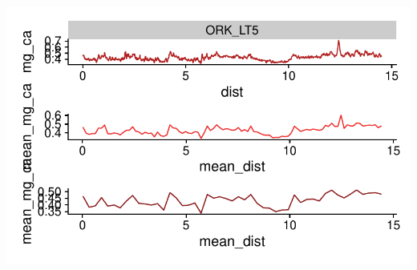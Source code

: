 \documentclass[
  authoryear,
  preprint,
  3p]{elsarticle}
\begin{document}
\includegraphics{Manuscript_files/figure-pdf/subsample-1.pdf}


\renewcommand\refname{References}
  
\end{document}
